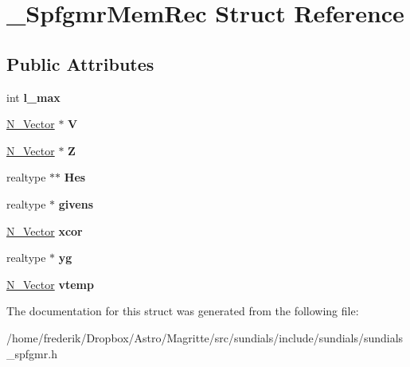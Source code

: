 \hypertarget{struct__SpfgmrMemRec}{}\section{\+\_\+\+Spfgmr\+Mem\+Rec Struct Reference}
\label{struct__SpfgmrMemRec}
\subsection*{Public Attributes}
\begin{DoxyCompactItemize}
\item 
\mbox{\label{struct__SpfgmrMemRec_af24f6b1fd5091f4acacad14d6def4d16}} 
int {\bfseries l\+\_\+max}
\item 
\mbox{\label{struct__SpfgmrMemRec_a02883a970bd8fd8569cf3baa529bf34d}} 
\mbox{\hyperlink{struct__generic__N__Vector}{N\+\_\+\+Vector}} $\ast$ {\bfseries V}
\item 
\mbox{\label{struct__SpfgmrMemRec_a39797dec3227e0ab1de771c2951e28cf}} 
\mbox{\hyperlink{struct__generic__N__Vector}{N\+\_\+\+Vector}} $\ast$ {\bfseries Z}
\item 
\mbox{\label{struct__SpfgmrMemRec_a9f90deaec7bf8a6578393fa78201a867}} 
realtype $\ast$$\ast$ {\bfseries Hes}
\item 
\mbox{\label{struct__SpfgmrMemRec_ab924f892ed96c5e4e3cd181c5677937a}} 
realtype $\ast$ {\bfseries givens}
\item 
\mbox{\label{struct__SpfgmrMemRec_aee271c39dd8c7a1aef1f369e7a293dc5}} 
\mbox{\hyperlink{struct__generic__N__Vector}{N\+\_\+\+Vector}} {\bfseries xcor}
\item 
\mbox{\label{struct__SpfgmrMemRec_adf095f07f93d1b3ecc34c20cbb5ac105}} 
realtype $\ast$ {\bfseries yg}
\item 
\mbox{\label{struct__SpfgmrMemRec_a64a533cef271373dad07e1256b28db87}} 
\mbox{\hyperlink{struct__generic__N__Vector}{N\+\_\+\+Vector}} {\bfseries vtemp}
\end{DoxyCompactItemize}


The documentation for this struct was generated from the following file\+:\begin{DoxyCompactItemize}
\item 
/home/frederik/\+Dropbox/\+Astro/\+Magritte/src/sundials/include/sundials/sundials\+\_\+spfgmr.\+h\end{DoxyCompactItemize}
